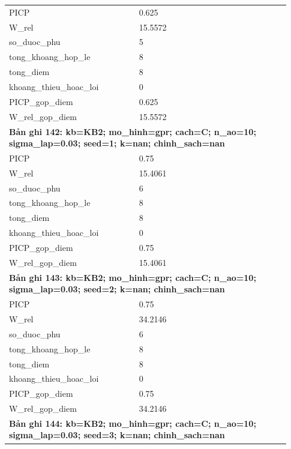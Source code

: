 \begin{longtable}{p{0.43\linewidth}p{0.50\linewidth}}
PICP & 0.625 \\
W\_\allowbreak rel & 15.5572 \\
so\_\allowbreak duoc\_\allowbreak phu & 5 \\
tong\_\allowbreak khoang\_\allowbreak hop\_\allowbreak le & 8 \\
tong\_\allowbreak diem & 8 \\
khoang\_\allowbreak thieu\_\allowbreak hoac\_\allowbreak loi & 0 \\
PICP\_\allowbreak gop\_\allowbreak diem & 0.625 \\
W\_\allowbreak rel\_\allowbreak gop\_\allowbreak diem & 15.5572 \\
\midrule
\multicolumn{2}{p{0.95\linewidth}}{\textbf{Bản ghi 142: kb=KB2; mo\_hinh=gpr; cach=C; n\_ao=10; sigma\_lap=0.03; seed=1; k=nan; chinh\_sach=nan}} \\
PICP & 0.75 \\
W\_\allowbreak rel & 15.4061 \\
so\_\allowbreak duoc\_\allowbreak phu & 6 \\
tong\_\allowbreak khoang\_\allowbreak hop\_\allowbreak le & 8 \\
tong\_\allowbreak diem & 8 \\
khoang\_\allowbreak thieu\_\allowbreak hoac\_\allowbreak loi & 0 \\
PICP\_\allowbreak gop\_\allowbreak diem & 0.75 \\
W\_\allowbreak rel\_\allowbreak gop\_\allowbreak diem & 15.4061 \\
\midrule
\multicolumn{2}{p{0.95\linewidth}}{\textbf{Bản ghi 143: kb=KB2; mo\_hinh=gpr; cach=C; n\_ao=10; sigma\_lap=0.03; seed=2; k=nan; chinh\_sach=nan}} \\
PICP & 0.75 \\
W\_\allowbreak rel & 34.2146 \\
so\_\allowbreak duoc\_\allowbreak phu & 6 \\
tong\_\allowbreak khoang\_\allowbreak hop\_\allowbreak le & 8 \\
tong\_\allowbreak diem & 8 \\
khoang\_\allowbreak thieu\_\allowbreak hoac\_\allowbreak loi & 0 \\
PICP\_\allowbreak gop\_\allowbreak diem & 0.75 \\
W\_\allowbreak rel\_\allowbreak gop\_\allowbreak diem & 34.2146 \\
\midrule
\multicolumn{2}{p{0.95\linewidth}}{\textbf{Bản ghi 144: kb=KB2; mo\_hinh=gpr; cach=C; n\_ao=10; sigma\_lap=0.03; seed=3; k=nan; chinh\_sach=nan}} \\

\end{longtable}

